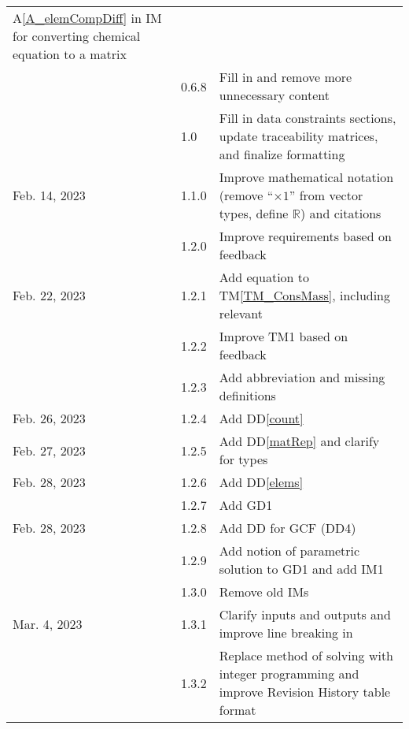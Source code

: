 \documentclass[12pt]{article}
\newcommand{\ddref}[1]{DD\ref{#1}}
\newcommand{\tmref}[1]{TM\ref{#1}}
\newcommand{\aref}[1]{A\ref{#1}}
\begin{document}
\begin{xltabular}{\textwidth}{llX}
  \aref{A_elemCompDiff} in IM for converting chemical equation to a matrix                                   \\
  & 0.6.8         & Fill in  and remove more unnecessary content  \\
  & 1.0           & Fill in data constraints sections, update traceability matrices, and
  finalize formatting                                                                                        \\
  Feb. 14, 2023       & 1.1.0         & Improve mathematical notation
  (remove ``$\times 1$'' from vector types, define $\mathbb{R}$) and citations                               \\
  & 1.2.0         & Improve requirements based on feedback                               \\
  Feb. 22, 2023       & 1.2.1         & Add equation to \tmref{TM_ConsMass}, including relevant
                                                                                      \\
  & 1.2.2         & Improve TM1 based on feedback                           \\
  & 1.2.3         & Add \progname{} abbreviation and missing definitions                 \\
  Feb. 26, 2023       & 1.2.4         & Add \ddref{count}                                                    \\
  Feb. 27, 2023       & 1.2.5         & Add \ddref{matRep} and clarify  for types       \\
  Feb. 28, 2023       & 1.2.6         & Add \ddref{elems}                                                    \\
  & 1.2.7         & Add GD1 \\
  Feb. 28, 2023 & 1.2.8         & Add DD for GCF (DD4) \\
  & 1.2.9         & Add notion of parametric solution to GD1 and add IM1 \\
  & 1.3.0         & Remove old IMs                                                       \\
  Mar. 4, 2023        & 1.3.1         & Clarify inputs and outputs and
  improve line breaking in                                                               \\
  & 1.3.2         & Replace method of solving with integer programming and
  improve Revision History table format \\

\end{xltabular}
\end{document}
